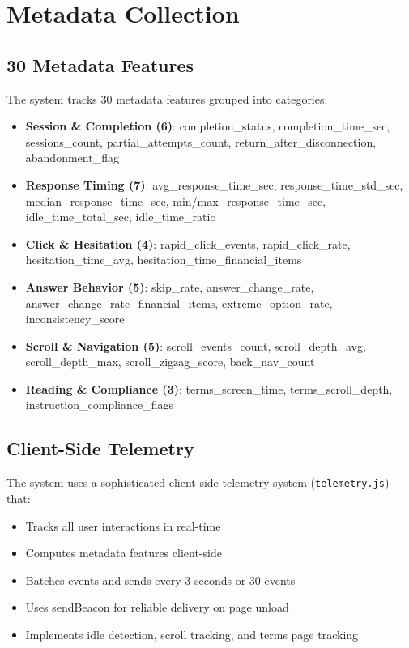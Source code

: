 \documentclass[11pt,a4paper]{article}
\begin{document}
\section{Metadata Collection}

\subsection{30 Metadata Features}
The system tracks 30 metadata features grouped into categories:

\begin{itemize}
    \item \textbf{Session \& Completion (6)}: completion\_status, completion\_time\_sec, sessions\_count, partial\_attempts\_count, return\_after\_disconnection, abandonment\_flag
    
    \item \textbf{Response Timing (7)}: avg\_response\_time\_sec, response\_time\_std\_sec, median\_response\_time\_sec, min/max\_response\_time\_sec, idle\_time\_total\_sec, idle\_time\_ratio
    
    \item \textbf{Click \& Hesitation (4)}: rapid\_click\_events, rapid\_click\_rate, hesitation\_time\_avg, hesitation\_time\_financial\_items
    
    \item \textbf{Answer Behavior (5)}: skip\_rate, answer\_change\_rate, answer\_change\_rate\_financial\_items, extreme\_option\_rate, inconsistency\_score
    
    \item \textbf{Scroll \& Navigation (5)}: scroll\_events\_count, scroll\_depth\_avg, scroll\_depth\_max, scroll\_zigzag\_score, back\_nav\_count
    
    \item \textbf{Reading \& Compliance (3)}: terms\_screen\_time, terms\_scroll\_depth, instruction\_compliance\_flags
\end{itemize}

\subsection{Client-Side Telemetry}
The system uses a sophisticated client-side telemetry system (\texttt{telemetry.js}) that:
\begin{itemize}
    \item Tracks all user interactions in real-time
    \item Computes metadata features client-side
    \item Batches events and sends every 3 seconds or 30 events
    \item Uses sendBeacon for reliable delivery on page unload
    \item Implements idle detection, scroll tracking, and terms page tracking
\end{itemize}
\end{document}
